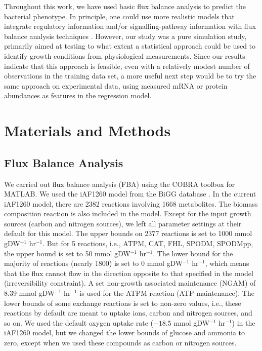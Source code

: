 \documentclass[12pt]{article}
\begin{document}
Throughout this work, we have used basic flux balance analysis to predict the bacterial phenotype. In principle, one could use more realistic models that integrate regulatory information and/or signalling-pathway information with flux balance analysis techniques \cite{CovertPalsson2002,Covertetal2008}. However, our study was a pure simulation study, primarily aimed at testing to what extent a statistical approach could be used to identify growth conditions from physiological measurements. Since our results indicate that this approach is feasible, even with a relatively modest number of observations in the training data set, a more useful next step would be to try the same approach on experimental data, using measured mRNA or protein abundances as features in the regression model.


\section*{Materials and Methods}

\subsection*{Flux Balance Analysis} 

We carried out flux balance analysis (FBA) using the COBRA toolbox \cite{Schellenbergeretal2011} for MATLAB. 
We used the iAF1260 model from the BiGG database \cite{Schellenbergeretal2010}. In the current iAF1260 model, there are 2382 reactions involving 1668 metabolites. The biomass composition reaction is also included in the model. Except for the input growth sources (carbon and nitrogen sources), we left all parameter settings at their default for this model. The upper bounds on 2377 reactions is set to 1000  mmol gDW$^{-1}$ hr$^{-1}$. But for 5 reactions, i.e., ATPM, CAT, FHL, SPODM, SPODMpp, the upper bound is set to 50 mmol gDW$^{-1}$ hr$^{-1}$. The lower bound for the majority of reactions (nearly 1800) is set to 0 mmol gDW$^{-1}$ hr$^{-1}$, which means that the flux cannot flow in the direction opposite to that specified in the model (irreversibility constraint). A set non-growth associated maintenance (NGAM) of 8.39  mmol gDW$^{-1}$ hr$^{-1}$ is used for the ATPM reaction (ATP maintenance). The lower bounds of some exchange reactions is set to non-zero values, i.e., these reactions by default are meant to uptake ions, carbon and nitrogen sources, and so on. We used the default oxygen uptake rate ($-18.5$ mmol gDW$^{-1}$ hr$^{-1}$) in the iAF1260 model, but we changed the lower bounds of glucose and ammonia to zero, except when we used these compounds as carbon or nitrogen sources.
\end{document}
